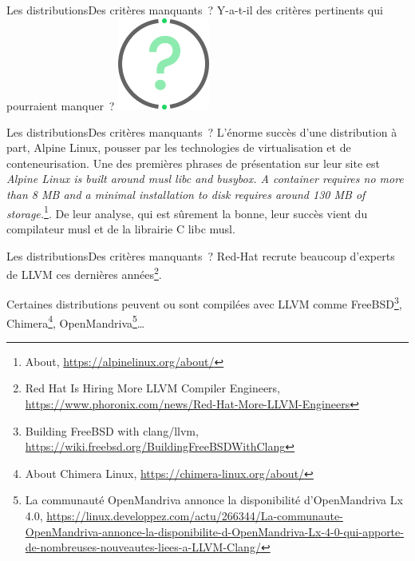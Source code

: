 \documentclass{beamer}
\begin{document}
    \begin{frame}{Les distributions}{Des critères manquants~?}
        Y-a-t-il des critères pertinents qui pourraient manquer~?
        \bigbreak
        \centering
        \includegraphics[width=3cm]{image/question-mark}
    \end{frame}

    \begin{frame}{Les distributions}{Des critères manquants~?}
        L'énorme succès d'une distribution à part, Alpine Linux, pousser par les technologies de virtualisation et de conteneurisation.
        \bigbreak
        Une des premières phrases de présentation sur leur site est \textit{Alpine Linux is built around musl libc and busybox. A container requires no more than 8 MB and a minimal installation to disk requires around 130 MB of storage.}\footnote{About, \url{https://alpinelinux.org/about/}}.
        \bigbreak
        De leur analyse, qui est sûrement la bonne, leur succès vient du compilateur musl et de la librairie C libc musl.
    \end{frame}

    \begin{frame}{Les distributions}{Des critères manquants~?}
        Red-Hat recrute beaucoup d'experts de LLVM ces dernières années\footnote{Red Hat Is Hiring More LLVM Compiler Engineers, \url{https://www.phoronix.com/news/Red-Hat-More-LLVM-Engineers}}.

        Certaines distributions peuvent ou sont compilées avec LLVM comme FreeBSD\footnote{Building FreeBSD with clang/llvm, \url{https://wiki.freebsd.org/BuildingFreeBSDWithClang}}, Chimera\footnote{About Chimera Linux, \url{https://chimera-linux.org/about/}}, OpenMandriva\footnote{La communauté OpenMandriva annonce la disponibilité d'OpenMandriva Lx 4.0, \url{https://linux.developpez.com/actu/266344/La-communaute-OpenMandriva-annonce-la-disponibilite-d-OpenMandriva-Lx-4-0-qui-apporte-de-nombreuses-nouveautes-liees-a-LLVM-Clang/}}\ldots
    \end{frame}
\end{document}
